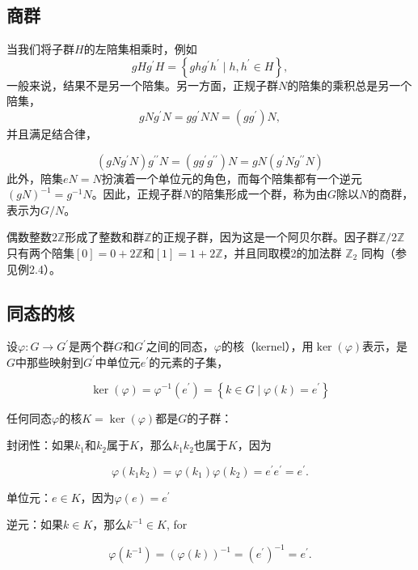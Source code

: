 \subsection{商群}
当我们将子群$H$的左陪集相乘时，例如
$$
g H g^{\prime} H=\left\{g h g^{\prime} h^{\prime} \mid h, h^{\prime} \in H\right\},
$$
一般来说，结果不是另一个陪集。另一方面，正规子群$N$的陪集的乘积总是另一个陪集，
$$
g N g^{\prime} N=g g^{\prime} N N=\left(g g^{\prime}\right) N,
$$
并且满足结合律，

$$
\left(g N g^{\prime} N\right) g^{\prime \prime} N=\left(g g^{\prime} g^{\prime \prime}\right) N=g N\left(g^{\prime} N g^{\prime \prime} N\right)
$$
此外，陪集$e N=N$扮演着一个单位元的角色，而每个陪集都有一个逆元 $(g N)^{-1}=g^{-1} N$。因此，正规子群$N$的陪集形成一个群，称为由$G$除以$N$的商群，表示为$G / N$。
\begin{eg}
    偶数整数$2 \mathbb{Z}$形成了整数和群$\mathbb{Z}$的正规子群，因为这是一个阿贝尔群。因子群$\mathbb{Z} / 2 \mathbb{Z}$只有两个陪集$[0]=0+2 \mathbb{Z}$和$[1]=1+2 \mathbb{Z}$，并且同取模2的加法群 $\mathbb{Z}_{2}$  同构（参见例2.4）。
\end{eg}

\subsection{同态的核}
设$\varphi: G \rightarrow G^{\prime}$是两个群$G$和$G^{\prime}$之间的同态，$\varphi$的核（kernel），用$\operatorname{ker}(\varphi)$表示，是$G$中那些映射到$G^{\prime}$中单位元$e^{\prime}$的元素的子集，

$$
\operatorname{ker}(\varphi)=\varphi^{-1}\left(e^{\prime}\right)=\left\{k \in G \mid \varphi(k)=e^{\prime}\right\}
$$

任何同态$\varphi$的核$K=\operatorname{ker}(\varphi)$都是$G$的子群：

封闭性：如果$k_{1}$和$k_{2}$属于$K$，那么$k_{1} k_{2}$也属于$K$，因为

$$
\varphi\left(k_{1} k_{2}\right)=\varphi\left(k_{1}\right) \varphi\left(k_{2}\right)=e^{\prime} e^{\prime}=e^{\prime} .
$$

单位元：$e \in K$，因为$\varphi(e)=e^{\prime}$

逆元：如果$k \in K$，那么$k^{-1} \in K$, for

$$
\varphi\left(k^{-1}\right)=(\varphi(k))^{-1}=\left(e^{\prime}\right)^{-1}=e^{\prime} .
$$

